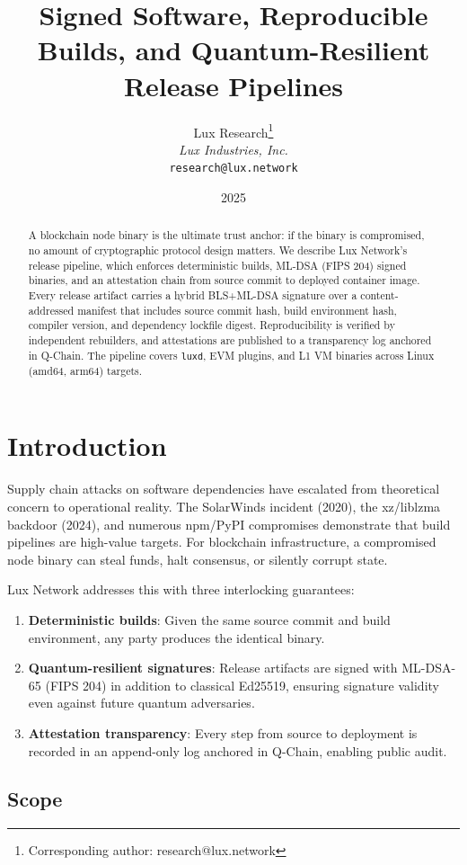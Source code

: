 \documentclass[11pt]{article}
\title{Signed Software, Reproducible Builds, and Quantum-Resilient Release Pipelines}
\author{
Lux Research\thanks{Corresponding author: research@lux.network}\\
\textit{Lux Industries, Inc.}\\
\texttt{research@lux.network}
}
\date{2025}
\begin{document}
\luxcoverpage

\begin{abstract}
A blockchain node binary is the ultimate trust anchor: if the binary is compromised, no amount of cryptographic protocol design matters. We describe Lux Network's release pipeline, which enforces deterministic builds, ML-DSA (FIPS 204) signed binaries, and an attestation chain from source commit to deployed container image. Every release artifact carries a hybrid BLS+ML-DSA signature over a content-addressed manifest that includes source commit hash, build environment hash, compiler version, and dependency lockfile digest. Reproducibility is verified by independent rebuilders, and attestations are published to a transparency log anchored in Q-Chain. The pipeline covers \texttt{luxd}, EVM plugins, and L1 VM binaries across Linux (amd64, arm64) targets.
\end{abstract}

\section{Introduction}

Supply chain attacks on software dependencies have escalated from theoretical concern to operational reality. The SolarWinds incident (2020), the xz/liblzma backdoor (2024), and numerous npm/PyPI compromises demonstrate that build pipelines are high-value targets. For blockchain infrastructure, a compromised node binary can steal funds, halt consensus, or silently corrupt state.

Lux Network addresses this with three interlocking guarantees:
\begin{enumerate}
\item \textbf{Deterministic builds}: Given the same source commit and build environment, any party produces the identical binary.
\item \textbf{Quantum-resilient signatures}: Release artifacts are signed with ML-DSA-65 (FIPS 204) in addition to classical Ed25519, ensuring signature validity even against future quantum adversaries.
\item \textbf{Attestation transparency}: Every step from source to deployment is recorded in an append-only log anchored in Q-Chain, enabling public audit.
\end{enumerate}

\subsection{Scope}
\end{document}
